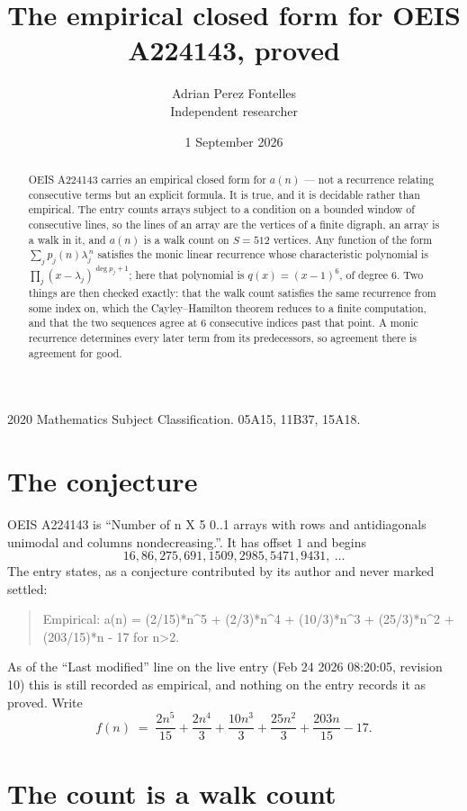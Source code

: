 \documentclass[11pt,a4paper]{article}
\title{The empirical closed form for OEIS A224143, proved}
\author{Adrian Perez Fontelles\\ \small Independent researcher}
\date{1 September 2026}
\theoremstyle{plain}
\theoremstyle{definition}
\begin{document}
\maketitle

\begin{abstract}
OEIS A224143 carries an empirical closed form for $a(n)$ --- not a recurrence relating
consecutive terms but an explicit formula. It is true, and it is decidable rather than
empirical. The entry counts arrays subject to a condition on a bounded window of consecutive lines, so the lines of an array are the
vertices of a finite digraph, an array is a walk in it, and $a(n)$ is a walk count on
$S=512$ vertices. Any function of the form $\sum_j p_j(n)\lambda_j^{\,n}$ satisfies the
monic linear recurrence whose characteristic polynomial is
$\prod_j(x-\lambda_j)^{\deg p_j+1}$; here that polynomial is $q(x)=(x-1)^{6}$, of degree
$6$. Two things are then checked exactly: that the walk count satisfies the same
recurrence from some index on, which the Cayley--Hamilton theorem reduces to a finite
computation, and that the two sequences agree at $6$ consecutive indices past that
point. A monic recurrence determines every later term from its predecessors, so agreement
there is agreement for good.
\end{abstract}

\noindent\small 2020 Mathematics Subject Classification. 05A15, 11B37, 15A18.\normalsize

\section{The conjecture}

OEIS A224143 is ``Number of n X 5 0..1 arrays with rows and antidiagonals unimodal and columns nondecreasing.''. It has offset $1$ and begins
\[
16, 86, 275, 691, 1509, 2985, 5471, 9431,\ \dots
\]
The entry states, as a conjecture contributed by its author and never marked settled:
\begin{quote}
Empirical: a(n) = (2/15)*n\^{}5 + (2/3)*n\^{}4 + (10/3)*n\^{}3 + (25/3)*n\^{}2 + (203/15)*n - 17 for n>2.
\end{quote}
As of the ``Last modified'' line on the live entry (Feb 24 2026 08:20:05, revision 10) this is still
recorded as empirical, and nothing on the entry records it as proved. Write
\[
f(n)\;=\;\frac{2 n^{5}}{15} + \frac{2 n^{4}}{3} + \frac{10 n^{3}}{3} + \frac{25 n^{2}}{3} + \frac{203 n}{15} - 17.
\]

\section{The count is a walk count}
\end{document}
